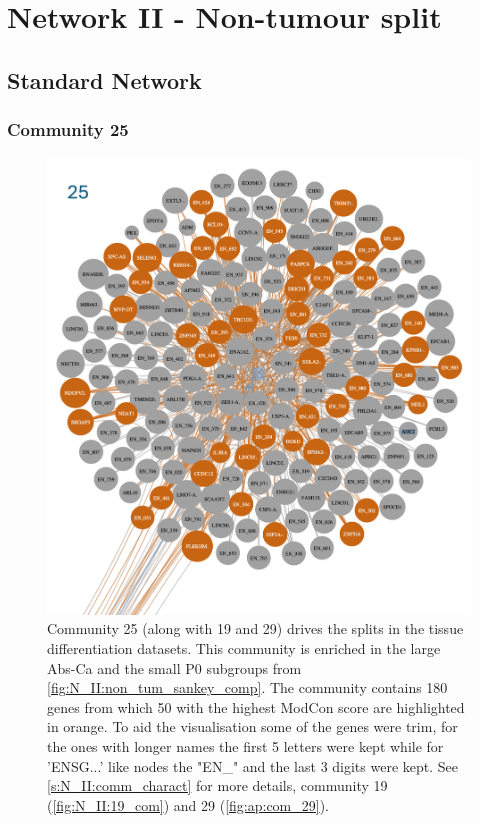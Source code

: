 \chapter{Network II - Non-tumour split}

\section{Standard Network} \label{ap:N_II:coms}

\newpage

\subsection*{Community 25}

\begin{figure}[H]    
    \centering
    \includegraphics[width=1.0\textwidth,height=1.0\textheight,keepaspectratio]{Sections/Network_II/resources/non_tum/25_com.png}
    \caption{Community 25 (along with 19 and 29) drives the splits in the tissue differentiation datasets. This community is enriched in the large Abs-Ca and the small P0 subgroups from \cref{fig:N_II:non_tum_sankey_comp}. The community contains 180 genes from which 50 with the highest ModCon score are highlighted in orange. To aid the visualisation some of the genes were trim, for the ones with longer names the first 5 letters were kept while for 'ENSG...' like nodes the "EN\_" and the last 3 digits were kept. See \cref{s:N_II:comm_charact} for more details, community 19 (\cref{fig:N_II:19_com}) and 29 (\cref{fig:ap:com_29}). }
    \label{fig:ap:com_25}
\end{figure}



